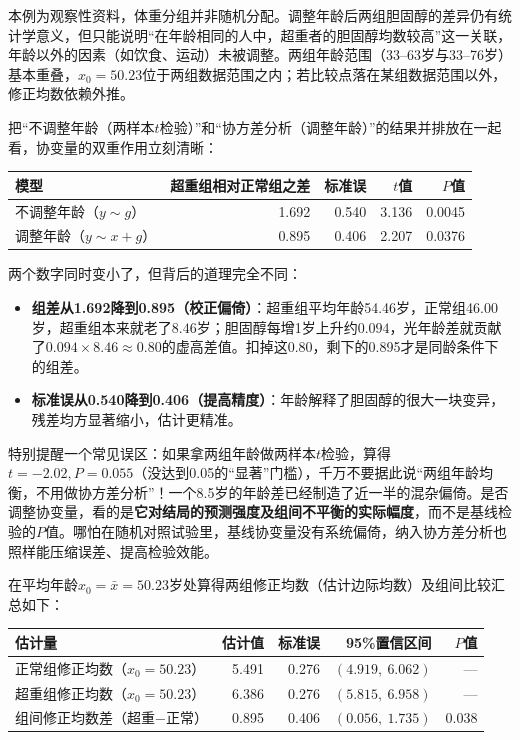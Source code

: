 本例为观察性资料，体重分组并非随机分配。调整年龄后两组胆固醇的差异仍有统计学意义，但只能说明“在年龄相同的人中，超重者的胆固醇均数较高”这一关联，年龄以外的因素（如饮食、运动）未被调整。两组年龄范围（33--63岁与33--76岁）基本重叠，$x_0=50.23$位于两组数据范围之内；若比较点落在某组数据范围以外，修正均数依赖外推。
\begin{sikao}[调整年龄前后发生了什么？]
把“不调整年龄（两样本$t$检验）”和“协方差分析（调整年龄）”的结果并排放在一起看，协变量的双重作用立刻清晰：
\begin{center}\small
\begin{tabular}{lrrrr}
\toprule 模型&超重组相对正常组之差&标准误&$t$值&$P$值\\\midrule
不调整年龄（$y\sim g$）&1.692&0.540&3.136&0.0045\\
调整年龄（$y\sim x+g$）&0.895&0.406&2.207&0.0376\\\bottomrule
\end{tabular}
\end{center}
两个数字同时变小了，但背后的道理完全不同：
\begin{itemize}
\item \textbf{组差从1.692降到0.895（校正偏倚）}：超重组平均年龄54.46岁，正常组46.00岁，超重组本来就老了$8.46$岁；胆固醇每增1岁上升约$0.094$，光年龄差就贡献了$0.094\times 8.46\approx 0.80$的虚高差值。扣掉这0.80，剩下的0.895才是同龄条件下的组差。
\item \textbf{标准误从0.540降到0.406（提高精度）}：年龄解释了胆固醇的很大一块变异，残差均方显著缩小，估计更精准。
\end{itemize}
特别提醒一个常见误区：如果拿两组年龄做两样本$t$检验，算得$t=-2.02,P=0.055$（没达到0.05的“显著”门槛），千万不要据此说“两组年龄均衡，不用做协方差分析”！一个8.5岁的年龄差已经制造了近一半的混杂偏倚。是否调整协变量，看的是\textbf{它对结局的预测强度及组间不平衡的实际幅度}，而不是基线检验的$P$值。哪怕在随机对照试验里，基线协变量没有系统偏倚，纳入协方差分析也照样能压缩误差、提高检验效能。
\end{sikao}
在平均年龄$x_0=\bar x=50.23$岁处算得两组修正均数（估计边际均数）及组间比较汇总如下：
\begin{center}\small
\begin{tabular}{lrrrr}
\toprule 估计量&估计值&标准误&95\%置信区间&$P$值\\\midrule
正常组修正均数（$x_0=50.23$）&5.491&0.276&$(4.919,\ 6.062)$&—\\
超重组修正均数（$x_0=50.23$）&6.386&0.276&$(5.815,\ 6.958)$&—\\
组间修正均数差（超重$-$正常）&0.895&0.406&$(0.056,\ 1.735)$&0.038\\\bottomrule
\end{tabular}
\end{center}

